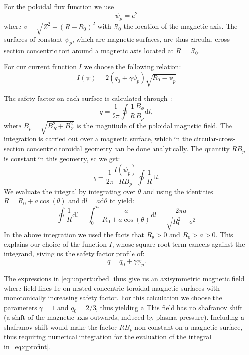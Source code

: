\documentclass[%
superscriptaddress,
amsmath,amssymb,
aps,
pre,
floatfix,
]{revtex4-2}
\begin{document}
For the poloidal flux function we use
\begin{equation}
  \psi_p = a^2
\end{equation}
where $a=\sqrt{Z^2 + (R-R_0)^2}$ with $R_0$ the location of the magnetic axis.
The surfaces of constant $\psi_p$, which are magnetic surfaces, are thus circular-cross-section concentric tori around a magnetic axis located at $R=R_0$.

For our current function $I$ we choose the following relation:
\begin{equation}
  I(\psi) = 2(q_0 + \gamma \psi_p)\sqrt{R_0-\psi_p}
\end{equation}


The safety factor on each surface is calculated through~\cite{wesson2011tokamaks}:
\begin{equation}\label{eq:qprofint}
  q=\frac{1}{2\pi} \oint \frac{1}{R}\frac{B_\phi}{B_p}\mathrm{d} l,
\end{equation}
where $B_p=\sqrt{B_R^2+B_Z^2}$ is the magnitude of the poloidal magnetic field.
The integration is carried out over a magnetic surface, which in the circular-cross-section concentric toroidal geometry can be done analytically.
The quantity $R B_p$ is constant in this geometry, so we get:
\begin{equation}
  q = \frac{1}{2\pi} \frac{I(\psi_p)}{RB_p}\oint \frac{1}{R} \mathrm{d}l.
\end{equation}
We evaluate the integral by integrating over $\theta$ and using the identities $R=R_0 +a \cos(\theta)$ and $\mathrm{d}l = a \mathrm{d}\theta$ to yield:
\begin{equation}
  \oint \frac{1}{R} \mathrm{d}l = \int_0^{2\pi} \frac{a}{R_0 + a \cos(\theta)} \mathrm{d}l =
  \frac{2\pi a}{\sqrt{R_0^2 -a^2}}
\end{equation}
In the above integration we used the facts that $R_0>0$ and $R_0>a>0$.
This explains our choice of the function $I$, whose square root term cancels against the integrand, giving us the safety factor profile of:
\begin{equation}
  q=q_0 + \gamma \psi_p.
\end{equation}

The expressions in \ref{eq:unperturbed} thus give us an axisymmetric magnetic field where field lines lie on nested concentric toroidal magnetic surfaces with monotonically increasing safety factor.
For this calculation we choose the parameters $\gamma=1$ and $q_0=2/3$, thus yielding a
This field has no shafranov shift (a shift of the magnetic axis outwards, induced by plasma pressure).
Including a shafranov shift would make the factor $RB_p$ non-constant on a magnetic surface, thus requiring numerical integration for the evaluation of the integral in~\ref{eq:qprofint}.
\end{document}
